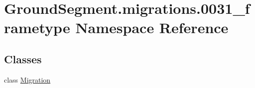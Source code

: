 \hypertarget{namespace_ground_segment_1_1migrations_1_10031__frametype}{}\section{Ground\+Segment.\+migrations.0031\+\_\+frametype Namespace Reference}
\label{namespace_ground_segment_1_1migrations_1_10031__frametype}
\subsection*{Classes}
\begin{DoxyCompactItemize}
\item 
class \hyperlink{class_ground_segment_1_1migrations_1_10031__frametype_1_1_migration}{Migration}
\end{DoxyCompactItemize}
